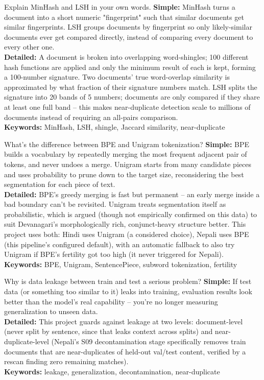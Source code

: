 \documentclass[11pt]{report}
\begin{document}
\begin{qabox}{Explain MinHash and LSH in your own words.}
\textbf{Simple:} MinHash turns a document into a short numeric
"fingerprint" such that similar documents get similar fingerprints. LSH
groups documents by fingerprint so only likely-similar documents ever get
compared directly, instead of comparing every document to every other
one.\\
\textbf{Detailed:} A document is broken into overlapping word-shingles;
100 different hash functions are applied and only the minimum result of
each is kept, forming a 100-number signature. Two documents' true
word-overlap similarity is approximated by what fraction of their
signature numbers match. LSH splits the signature into 20 bands of 5
numbers; documents are only compared if they share at least one full
band -- this makes near-duplicate detection scale to millions of
documents instead of requiring an all-pairs comparison.\\
\textbf{Keywords:} MinHash, LSH, shingle, Jaccard similarity, near-duplicate
\end{qabox}

\begin{qabox}{What's the difference between BPE and Unigram tokenization?}
\textbf{Simple:} BPE builds a vocabulary by repeatedly merging the most
frequent adjacent pair of tokens, and never undoes a merge. Unigram
starts from many candidate pieces and uses probability to prune down to
the target size, reconsidering the best segmentation for each piece of
text.\\
\textbf{Detailed:} BPE's greedy merging is fast but permanent -- an early
merge inside a bad boundary can't be revisited. Unigram treats
segmentation itself as probabilistic, which is argued (though not
empirically confirmed on this data) to suit Devanagari's morphologically
rich, conjunct-heavy structure better. This project uses both: Hindi uses
Unigram (a considered choice), Nepali uses BPE (this pipeline's
configured default), with an automatic fallback to also try Unigram if
BPE's fertility got too high (it never triggered for Nepali).\\
\textbf{Keywords:} BPE, Unigram, SentencePiece, subword tokenization,
fertility
\end{qabox}

\begin{qabox}{Why is data leakage between train and test a serious
problem?}
\textbf{Simple:} If test data (or something too similar to it) leaks
into training, evaluation results look better than the model's real
capability -- you're no longer measuring generalization to unseen data.\\
\textbf{Detailed:} This project guards against leakage at two levels:
document-level (never split by sentence, since that leaks context across
splits) and near-duplicate-level (Nepali's S09 decontamination stage
specifically removes train documents that are near-duplicates of
held-out val/test content, verified by a rescan finding zero remaining
matches).\\
\textbf{Keywords:} leakage, generalization, decontamination,
near-duplicate
\end{qabox}
\end{document}
